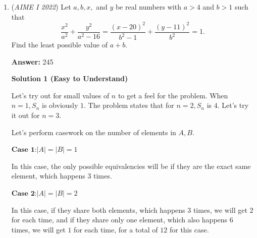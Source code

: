 \begin{enumerate}
 According to Power of a Point, $CQ\cdot CP=CE^2\rightarrow 16\cdot 25=CE^2\rightarrow CE=20$.

 Similarly, $AP\cdot AQ=AF^2\rightarrow 3\cdot 12=AF^2\rightarrow AF=6$.

 (Note that $AG=AF=6$ because they are intersecting tangents from the same circle. Furthermore, $HE=AG=6$ due to a simple upwards translation.)

 Therefore, $HC=HE+EC=6+20=26$, and we already know that $AC=28$, meaning that we can use the Pythagorean Theorem on $\Delta AHC$ to obtain: $AH=6\sqrt{3}$.

 Let $HB=k$. Then $BE=6-HB=6-k$. Since they are intersecting tangents from the same circle, $BF=BE=6-k$.

 Therefore, $AB=AF+BF=6+6-k=12-k$. We have all the side lengths of $\Delta ABH$, so applying the Pythagorean Theorem: $(6\sqrt{3})^2+k^2=(12-k)^2\rightarrow k=\frac{3}{2}$.

 Thus, $BC=BE+EC=6-k+20=26-k=\frac{49}{2}$.

 $[ABCD]=AH\cdot BC=6\sqrt{3}\cdot \frac{49}{2}=147\sqrt{3}$, so the answer is $\boxed{150}$.

 


	\item (\textit{AIME I 2022}) Let $a, b, x,$ and $y$ be real numbers with $a>4$ and $b>1$ such that
 \[\frac{x^2}{a^2}+\frac{y^2}{a^2-16}=\frac{(x-20)^2}{b^2-1}+\frac{(y-11)^2}{b^2}=1.\]Find the least possible value of $a+b.$

 \textbf{Answer: }245



\textbf{Solution 1 (Easy to Understand)}

Let's try out for small values of $n$ to get a feel for the problem. When $n=1, S_n$ is obviously $1$. The problem states that for $n=2, S_n$ is $4$. Let's try it out for $n=3$. 

 Let's perform casework on the number of elements in $A, B$. 

 $\textbf{Case 1:} |A| = |B| = 1$

 In this case, the only possible equivalencies will be if they are the exact same element, which happens $3$ times.

 $\textbf{Case 2:} |A| = |B| = 2$

 In this case, if they share both elements, which happens $3$ times, we will get $2$ for each time, and if they share only one element, which also happens $6$ times, we will get $1$ for each time, for a total of $12$ for this case.


\end{enumerate}
